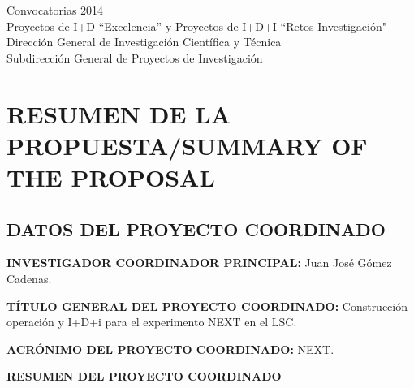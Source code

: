 \documentclass[a4paper,11pt,oneside]{article}
\begin{document}


\begin{center}
{\Large \textsf{Convocatorias 2014}} \\ \vspace{0.3cm}
{\Large  \textsf{Proyectos de I+D ``Excelencia'' y Proyectos de I+D+I ``Retos Investigación"}} \\ 
{\Large \textsf{Dirección General de Investigación Científica y Técnica}} \\
{\Large \textsf{Subdirección General de Proyectos de Investigación }} \\ 
\end{center}


\section{RESUMEN DE LA PROPUESTA/SUMMARY OF THE PROPOSAL}


\subsection{DATOS DEL PROYECTO COORDINADO}

{\sc \bf INVESTIGADOR COORDINADOR PRINCIPAL:} Juan José Gómez Cadenas.
\vspace{0.3cm}

{\sc \bf TÍTULO GENERAL DEL PROYECTO COORDINADO:} Construcción operación y I+D+i para el experimento NEXT en el LSC.
\vspace{0.3cm}

{\sc \bf ACRÓNIMO DEL PROYECTO COORDINADO:} NEXT.
\vspace{0.3cm}

{\sc \bf  RESUMEN DEL PROYECTO COORDINADO} 
\vspace{0.3cm}

 
\end{document}
